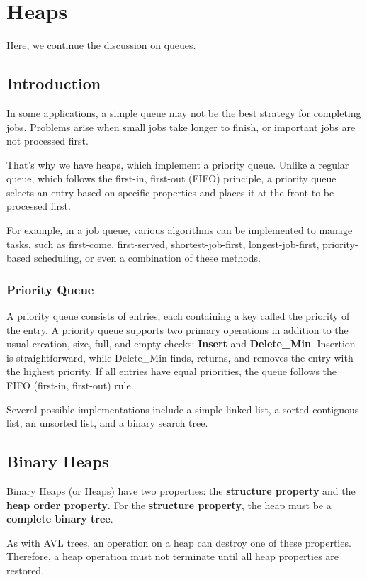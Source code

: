 \chapter{Heaps}
Here, we continue the discussion on queues. 

\section{Introduction}
In some applications, a simple queue may not be the best strategy for completing jobs. Problems arise when small jobs take longer to finish, or important jobs are not processed first.  

That's why we have heaps, which implement a priority queue. Unlike a regular queue, which follows the first-in, first-out (FIFO) principle, a priority queue selects an entry based on specific properties and places it at the front to be processed first.  

For example, in a job queue, various algorithms can be implemented to manage tasks, such as first-come, first-served, shortest-job-first, longest-job-first, priority-based scheduling, or even a combination of these methods.

\subsection{Priority Queue}
A priority queue consists of entries, each containing a key called the priority of the entry. A priority queue supports two primary operations in addition to the usual creation, size, full, and empty checks: \textbf{Insert} and \textbf{Delete\_Min}. Insertion is straightforward, while Delete\_Min finds, returns, and removes the entry with the highest priority. If all entries have equal priorities, the queue follows the FIFO (first-in, first-out) rule.

Several possible implementations include a simple linked list, a sorted contiguous list, an unsorted list, and a binary search tree.

\section{Binary Heaps}
Binary Heaps (or Heaps) have two properties: the \textbf{structure property} and the \textbf{heap order property}. For the \textbf{structure property}, the heap must be a \textbf{complete binary tree}.  

As with AVL trees, an operation on a heap can destroy one of these properties. Therefore, a heap operation must not terminate until all heap properties are restored.  

